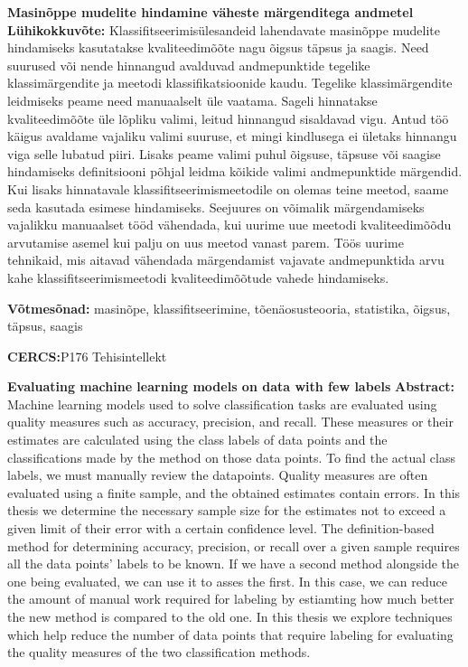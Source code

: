 
\noindent\textbf{\large Masinõppe mudelite hindamine väheste märgenditega andmetel}
\vspace*{1ex}
\noindent\textbf{Lühikokkuvõte:}
\noindent
Klassifitseerimisülesandeid lahendavate masinõppe mudelite hindamiseks kasutatakse kvaliteedimõõte nagu õigsus täpsus ja saagis. Need suurused või nende hinnangud avalduvad andmepunktide tegelike klassimärgendite ja meetodi klassifikatsioonide kaudu. Tegelike klassimärgendite leidmiseks peame need manuaalselt üle vaatama. Sageli hinnatakse kvaliteedimõõte üle lõpliku valimi, leitud hinnangud sisaldavad vigu. Antud töö käigus avaldame vajaliku valimi suuruse, et mingi kindlusega ei ületaks hinnangu viga selle lubatud piiri. Lisaks peame valimi puhul õigsuse, täpsuse või saagise hindamiseks definitsiooni põhjal leidma kõikide valimi andmepunktide märgendid. Kui lisaks hinnatavale klassifitseerimismeetodile on olemas teine meetod, saame seda kasutada esimese hindamiseks. Seejuures on võimalik märgendamiseks vajalikku manuaalset tööd vähendada, kui uurime uue meetodi kvaliteedimõõdu arvutamise asemel kui palju on uus meetod vanast parem. Töös uurime tehnikaid, mis aitavad vähendada märgendamist vajavate andmepunktida arvu kahe klassifitseerimismeetodi kvaliteedimõõtude vahede hindamiseks.
\vspace*{1ex}

\noindent\textbf{Võtmesõnad:} masinõpe, klassifitseerimine, tõenäosusteooria, statistika, õigsus, täpsus, saagis
\vspace*{1ex}

\noindent\textbf{CERCS:}P176 Tehisintellekt
\vspace*{3ex}


\noindent\textbf{\large Evaluating machine learning models on data with few labels}
\vspace*{1ex}
\noindent\textbf{Abstract:}
\noindent
Machine learning models used to solve classification tasks are evaluated using quality measures such as accuracy, precision, and recall. These measures or their estimates are calculated using the class labels of data points and the classifications made by the method on those data points. To find the actual class labels, we must manually review the datapoints. Quality measures are often evaluated using a finite sample, and the obtained estimates contain errors. In this thesis we determine the necessary sample size for the estimates not to exceed a given limit of their error with a certain confidence level. The definition-based method for determining accuracy, precision, or recall over a given sample requires all the data points' labels to be known. If we have a second method alongside the one being evaluated, we can use it to asses the first. In this case, we can reduce the amount of manual work required for labeling by estiamting how much better the new method is compared to the old one. In this thesis we explore techniques which help reduce the number of data points that require labeling for evaluating the quality measures of the two classification methods.
\vspace*{1ex}

